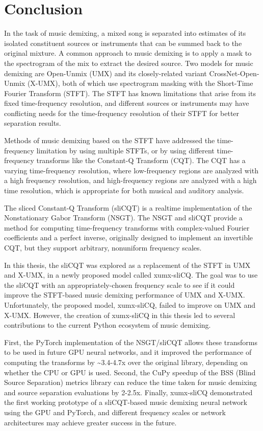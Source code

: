 \documentclass[report.tex]{subfiles}
\begin{document}
\section{Conclusion}
\label{sec:conclusion}

In the task of music demixing, a mixed song is separated into estimates of its isolated constituent sources or instruments that can be summed back to the original mixture. A common approach to music demixing is to apply a mask to the spectrogram of the mix to extract the desired source. Two models for music demixing are Open-Unmix (UMX) and its closely-related variant CrossNet-Open-Unmix (X-UMX), both of which use spectrogram masking with the Short-Time Fourier Transform (STFT). The STFT has known limitations that arise from its fixed time-frequency resolution, and different sources or instruments may have conflicting needs for the time-frequency resolution of their STFT for better separation results.

Methods of music demixing based on the STFT have addressed the time-frequency limitation by using multiple STFTs, or by using different time-frequency transforms like the Constant-Q Transform (CQT). The CQT has a varying time-frequency resolution, where low-frequency regions are analyzed with a high frequency resolution, and high-frequency regions are analyzed with a high time resolution, which is appropriate for both musical and auditory analysis.

The sliced Constant-Q Transform (sliCQT) is a realtime implementation of the Nonstationary Gabor Transform (NSGT). The NSGT and sliCQT provide a method for computing time-frequency transforms with complex-valued Fourier coefficients and a perfect inverse, originally designed to implement an invertible CQT, but they support arbitrary, nonuniform frequency scales.

In this thesis, the sliCQT was explored as a replacement of the STFT in UMX and X-UMX, in a newly proposed model called xumx-sliCQ. The goal was to use the sliCQT with an appropriately-chosen frequency scale to see if it could improve the STFT-based music demixing performance of UMX and X-UMX. Unfortunately, the proposed model, xumx-sliCQ, failed to improve on UMX and X-UMX. However, the creation of xumx-sliCQ in this thesis led to several contributions to the current Python ecosystem of music demixing.

First, the PyTorch implementation of the NSGT/sliCQT allows these transforms to be used in future GPU neural networks, and it improved the performance of computing the transforms by \textasciitilde3.4-4.7x over the original library, depending on whether the CPU or GPU is used. Second, the CuPy speedup of the BSS (Blind Source Separation) metrics library can reduce the time taken for music demixing and source separation evaluations by 2-2.5x. Finally, xumx-sliCQ demonstrated the first working prototype of a sliCQT-based music demixing neural network using the GPU and PyTorch, and different frequency scales or network architectures may achieve greater success in the future.
\end{document}
